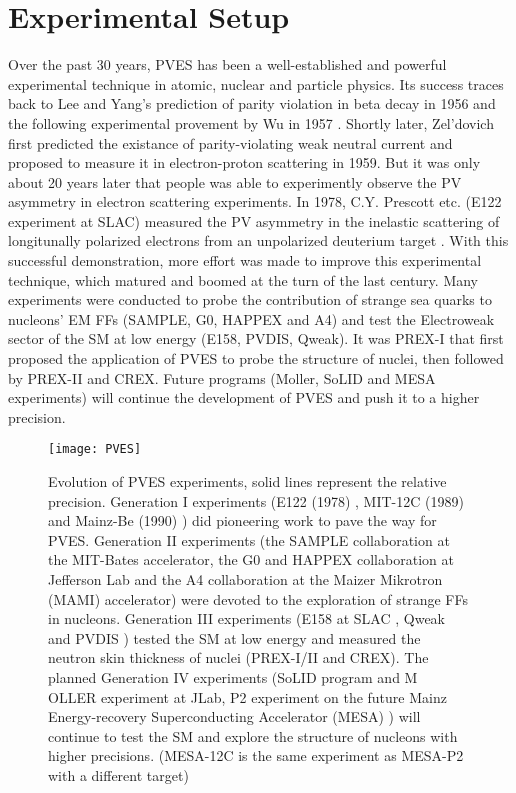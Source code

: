 \chapter{Experimental Setup}
Over the past 30 years, PVES has been a well-established and powerful 
experimental technique in atomic, nuclear and particle physics. Its success 
traces back to Lee and Yang's prediction of parity violation in beta decay in 1956 \cite{PhysRev.104.254}
and the following experimental provement by Wu in 1957 \cite{PhysRev.105.1413}.
Shortly later, Zel'dovich first predicted the existance of parity-violating weak 
neutral current and proposed to measure
it in electron-proton scattering \cite{Zeldovich} in 1959. But it was only about 
20 years later that people was able to experimently observe the PV asymmetry 
in electron scattering experiments. 
In 1978, C.Y. Prescott etc. (E122 experiment at SLAC) measured the PV asymmetry in the 
inelastic scattering of longitunally 
polarized electrons from an unpolarized deuterium target \cite{PRESCOTT1978347}.
With this successful demonstration, more effort was made to improve this experimental
technique, which matured and boomed at the turn of the last century. Many experiments 
were conducted to probe the contribution of strange sea quarks
to nucleons' EM FFs (SAMPLE, G0, HAPPEX and A4) and test the Electroweak 
sector of the SM at low energy (E158, PVDIS, Qweak).
It was PREX-I that first proposed the application of PVES to probe the structure
of nuclei, then followed by PREX-II and CREX. Future programs (M\/oller, SoLID 
and MESA experiments) will continue the development of PVES and push it to a
higher precision.

\begin{figure}[h!]
    \centering
    \texttt{[image: PVES]}
    \caption{Evolution of PVES experiments, solid lines represent the relative 
    precision. Generation I experiments (E122 (1978) \cite{PRESCOTT1978347}, 
    MIT-12C (1989) \cite{PhysRevLett.65.694} and Mainz-Be (1990) \cite{HEIL19891}) 
    did pioneering work to pave the way for PVES. Generation II experiments
    (the SAMPLE collaboration \cite{SAMPLE} at the MIT-Bates accelerator, 
    the G0 \cite{G0} and HAPPEX \cite{HAPPEX} collaboration at Jefferson Lab and
    the A4 collaboration \cite{A4} at the Maizer Mikrotron (MAMI) accelerator) 
    were devoted to the exploration of strange FFs in nucleons.
    Generation III experiments (E158 at SLAC \cite{PhysRevLett.95.081601}, 
    Qweak \cite{PhysRevLett.111.141803} and PVDIS \cite{PhysRevLett.111.082501})
    tested the SM at low energy and measured the neutron skin thickness of nuclei
    (PREX-I/II and CREX). The planned Generation IV experiments (SoLID program \cite{SoLID}
    and M\\OLLER experiment \cite{Moller} at JLab, P2 experiment on the future
    Mainz Energy-recovery Superconducting Accelerator (MESA) \cite{MESA-P2})
    will continue to test the SM and explore the structure of nucleons with higher precisions.
    (MESA-12C is the same experiment as MESA-P2 with a different \C target) }
\end{figure}

